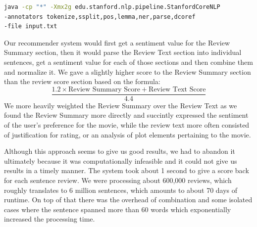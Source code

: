 \documentclass{article} %
\begin{document}
\begin{lstlisting}[language=bash]
java -cp "*" -Xmx2g edu.stanford.nlp.pipeline.StanfordCoreNLP 
-annotators tokenize,ssplit,pos,lemma,ner,parse,dcoref 
-file input.txt
\end{lstlisting}

 Our recommender system would first get a sentiment value for the Review Summary section, then it would parse the Review Text section into individual sentences, get a sentiment value for each of those sections and then combine them and normalize it. We gave a slightly higher score to the Review Summary section than the review score section based on the formula:
\[
\frac{1.2 \times \text{Review Summary Score} + \text{Review Text Score}}{4.4}
\]
We more heavily weighted the Review Summary over the Review Text as we found the Review Summary more directly and succintly expressed the sentiment of the user's preference for the movie, while the review text more often consisted of justification for rating, or an analysis of plot elements pertaining to the movie. 

Although this approach seems to give us good results, we had to abandon it ultimately because it was computationally infeasible and it could not give us results in a timely manner. The system took about 1 second to give a score back for each sentence review. We were processing about 600,000 reviews, which roughly translates to 6 million sentences, which amounts to about 70 days of runtime. On top of that there was the overhead of combination and some isolated cases where the sentence spanned more than 60 words which exponentially increased the processing time. 
\end{document}
